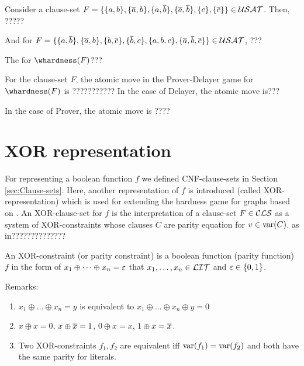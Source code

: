\documentclass{report}
\begin{document}
\begin{examp}\label{exp:gamehd}
Consider a clause-set $F=\{ \{ a,b \},\{ \overline a,b \},\{ a,\overline b \},\{ \overline a,\overline b \},\{ c \},\{ \overline c \} \} \in \mathcal{USAT}$. Then, ?????

And for $F=\{ \{ a,\overline{b} \},\{ \overline{a},b \},\{ b,\overline{c} \},\{ \overline{b},c \},\{ a,b,c \},\{ \overline{a},\overline{b},\overline{c} \} \} \in \mathcal{USAT}$, ???
\end{examp}

The for $\whardness(F)$???

\begin{defi}\label{def:atomic-move}
For the clause-set $F$, the atomic move in the Prover-Delayer game for $\whardness(F)$ is ???????????
In the case of Delayer, the atomic move is???

In the case of Prover, the atomic move is ????
\end{defi}

\section{XOR representation}
\label{sec:XOR representation}
For representing a boolean function $f$ we defined CNF-clause-sets in Section \ref{sec:Clause-sets}. Here, another representation of $f$ is introduced (called XOR-representation) which is used for extending the hardness game for graphs based on \cite{h8,h23}. An XOR-clause-set for $f$ is the interpretation of a clause-set $F \in \mathcal{CLS}$ as a system of XOR-constraints whose clauses $C$ are parity equation for $v \in \operatorname{var}(C)$. 
as in??????????????
\begin{defi}\label{def:xor-const} 
An XOR-constraint (or parity constraint) is a boolean function (parity function) $f$ in the form of $x_1 \oplus \dots \oplus x_n = \varepsilon$ that $x_1, \dots, x_n \in \mathcal{LIT}$ and $\varepsilon \in \{ 0,1 \}$.
\end{defi}

Remarks:
\begin{enumerate}
    \item $x_1 \oplus \dots \oplus x_n = y$ is equivalent to $x_1 \oplus \dots \oplus x_n \oplus y = 0$
    \item $x \oplus x = 0$, $x \oplus \overline{x} = 1$, $0 \oplus x = x$, $1 \oplus x = \overline{x}$.
    \item Two XOR-constraints $f_1, f_2$ are equivalent iff $\operatorname{var}(f_1) = \operatorname{var}(f_2)$ and both have the same parity for literals.
\end{enumerate}
\end{document}
